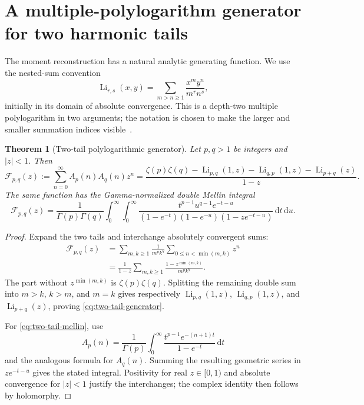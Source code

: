 \documentclass[11pt]{article}
\newtheorem{theorem}{Theorem}[section]
\theoremstyle{definition}
\newcommand{\Li}{\operatorname{Li}}
\newcommand{\dd}{\,\mathrm{d}}
\newcommand{\calF}{\mathcal{F}}
\begin{document}
 \section{A multiple-polylogarithm generator for two harmonic tails}
\label{sec:polylog-generator}

The moment reconstruction has a natural analytic generating function.
We use the nested-sum convention
\begin{equation}
 \Li_{r,s}(x,y)=
 \sum_{m>n\ge1}\frac{x^m y^n}{m^r n^s},
 \label{eq:two-variable-mpl}
\end{equation}
initially in its domain of absolute convergence.  This is a depth-two
multiple polylogarithm in two arguments; the notation is chosen to make
the larger and smaller summation indices visible~\cite{Goncharov,BorweinMPL}.

\begin{theorem}[Two-tail polylogarithmic generator]
\label{thm:two-tail-generator}
Let $p,q>1$ be integers and $|z|<1$.  Then
\begin{equation}
 \boxed{\displaystyle
 \calF_{p,q}(z):=\sum_{n=0}^{\infty}A_p(n)A_q(n)z^n
 =\frac{\zeta(p)\zeta(q)
 -\Li_{p,q}(1,z)-\Li_{q,p}(1,z)-\Li_{p+q}(z)}{1-z}.}
 \label{eq:two-tail-generator}
\end{equation}
The same function has the Gamma-normalized double Mellin integral
\begin{equation}
 \calF_{p,q}(z)=
 \frac1{\Gamma(p)\Gamma(q)}
 \int_0^\infty\!\int_0^\infty
 \frac{t^{p-1}u^{q-1}e^{-t-u}}
 {(1-e^{-t})(1-e^{-u})(1-ze^{-t-u})}
 \dd t\dd u.
 \label{eq:two-tail-mellin}
\end{equation}
\end{theorem}

\begin{proof}
Expand the two tails and interchange absolutely convergent sums:
\begin{align*}
 \calF_{p,q}(z)
 &=\sum_{m,k\ge1}\frac1{m^pk^q}
   \sum_{0\le n<\min(m,k)}z^n\\
 &=\frac1{1-z}\sum_{m,k\ge1}
   \frac{1-z^{\min(m,k)}}{m^pk^q}.
\end{align*}
The part without $z^{\min(m,k)}$ is $\zeta(p)\zeta(q)$.  Splitting the
remaining double sum into $m>k$, $k>m$, and $m=k$ gives respectively
$\Li_{p,q}(1,z)$, $\Li_{q,p}(1,z)$, and $\Li_{p+q}(z)$, proving
\eqref{eq:two-tail-generator}.

For \eqref{eq:two-tail-mellin}, use
\[
 A_p(n)=\frac1{\Gamma(p)}\int_0^\infty
 \frac{t^{p-1}e^{-(n+1)t}}{1-e^{-t}}\dd t
\]
and the analogous formula for $A_q(n)$.  Summing the resulting geometric
series in $ze^{-t-u}$ gives the stated integral.  Positivity for real
$z\in[0,1)$ and absolute convergence for $|z|<1$ justify the
interchanges; the complex identity then follows by holomorphy.
\end{proof}
\end{document}
